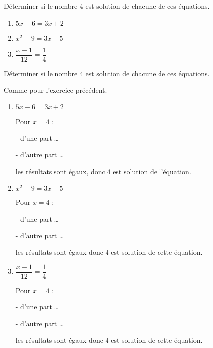 \begin{exercice*}
    Déterminer si le nombre \num{4} est solution de chacune de ces équations.
    \begin{enumerate}
        \item $5x-6=3x+2$
        \item $x^2-9=3x-5$
        \item $\dfrac{x-1}{12}=\dfrac{1}{4}$
    \end{enumerate}
\end{exercice*}
\begin{corrige}
    Déterminer si le nombre \num{4} est solution de chacune de ces équations.

    {\color{red}Comme pour l'exercice précédent.}
    \begin{enumerate}
        \item $5x-6=3x+2$
        
        {\color{red}Pour $x=4$ :
        
        - d'une part \dots
        
        - d'autre part \dots
        
        les résultats sont égaux, donc $4$ est solution de l'équation.
        }
        \item $x^2-9=3x-5$
        
        {\color{red}Pour $x=4$ :
        
        - d'une part \dots
        
        - d'autre part \dots
        
        les résultats sont égaux donc $4$ est solution de cette équation.
        }
        \item $\dfrac{x-1}{12}=\dfrac{1}{4}$
        
        {\color{red}Pour $x=4$ :
        
        - d'une part \dots
        
        - d'autre part \dots
        
        les résultats sont égaux donc $4$ est solution de cette équation.
        }
    \end{enumerate}
\end{corrige}

